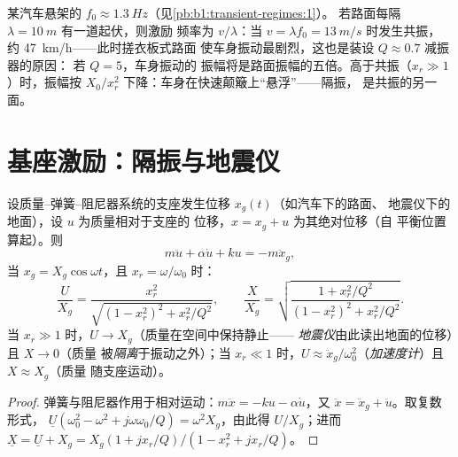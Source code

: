 \begin{example}[共振速率]\label{ex:b1:oscillators-resonance:road}
某汽车悬架的 $f_0 \approx \qty{1.3}{Hz}$（见\cref{pb:b1:transient-regimes:1}）。
若路面每隔 $\lambda = \qty{10}{m}$ 有一道起伏，则激励
频率为 $v/\lambda$：当 $v = \lambda f_0 = \qty{13}{m/s}$ 时发生共振，
约 \qty{47}{km/h}——此时搓衣板式路面
使车身振动最剧烈，这也是装设 $Q \approx 0.7$ 减振器的原因：
若 $Q = 5$，车身振动的
振幅将是路面振幅的五倍。高于共振（$x_r \gg 1$）时，振幅按
$X_0/x_r^2$ 下降：车身在快速颠簸上“悬浮”——隔振，
是共振的另一面。
\end{example}

\section{基座激励：隔振与地震仪}

\begin{proposition}[由支座带动的振子]\label{prop:b1:oscillators-resonance:base}
设质量–弹簧–阻尼器系统的支座发生位移 $x_g(t)$（如汽车下的路面、
地震仪下的地面），设 $u$ 为质量相对于支座的
位移，$x = x_g + u$ 为其绝对位移（自
平衡位置算起）。则
\[
m\ddot u + \alpha\dot u + ku = -m\ddot x_g ,
\]
当 $x_g = X_g\cos\omega t$，且 $x_r = \omega/\omega_0$ 时：
\[
\frac{U}{X_g} = \frac{x_r^2}{\sqrt{(1 - x_r^2)^2 + x_r^2/Q^2}},
\qquad
\frac{X}{X_g} = \sqrt{\frac{1 + x_r^2/Q^2}{(1 - x_r^2)^2 + x_r^2/Q^2}} .
\]
当 $x_r \gg 1$ 时，$U \to X_g$（质量在空间中保持静止——
\emph{地震仪}由此读出地面的位移）且 $X \to 0$（质量
被\emph{隔离}于振动之外）；当 $x_r \ll 1$ 时，$U \approx
\ddot x_g/\omega_0^2$（\emph{加速度计}）且 $X \approx X_g$（质量
随支座运动）。
\end{proposition}

\begin{proof}
弹簧与阻尼器作用于相对运动：$m\ddot x = -ku -
\alpha\dot u$，又 $\ddot x = \ddot x_g + \ddot u$。取复数形式，
$\underline U(\omega_0^2 - \omega^2 + j\omega\omega_0/Q) = \omega^2X_g$，由此得
$U/X_g$；进而 $\underline X = \underline U + X_g = X_g(1 + jx_r/Q)/(1 -
x_r^2 + jx_r/Q)$。
\end{proof}

